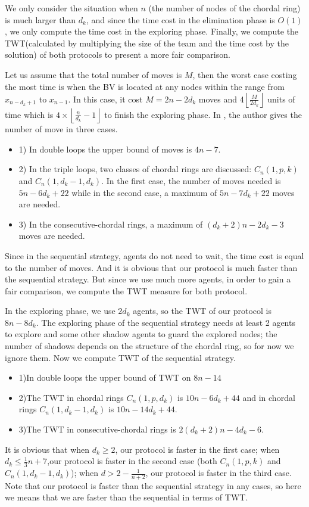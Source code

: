  
 
 

We only consider the situation when $n$ (the number of nodes of the chordal ring) is much larger than $d_k$, and since the time cost in the elimination phase is $O(1)$, we only compute the time cost in the exploring phase. Finally, we compute the TWT(calculated by multiplying the size of the team and the time cost by the solution) of both protocols to present a more fair comparison.

Let us assume that the total number of moves is $M$, then the worst case costing the most time is when the BV is located at any nodes within the range from $x_{n-d_k+1}$ to $x_{n-1}$. In this case, it cost $M=2n-2d_k$ moves and 4$\left \lfloor \frac{M}{2d_k}\right \rfloor$ units of time which is $4\times \left \lfloor \frac{n}{d_k}-1\right \rfloor$ to finish the exploring phase. 
In \cite{alotaibi}, the author gives the number of move in three cases.
\begin{itemize}
\item 1) In double loops the upper bound of moves is $4n-7$.
\item 2) In the triple loops,  two classes of chordal rings are discussed: $C_n(1,p,k)$ and $C_n(1,d_k-1,d_k)$. In the first case, the number of moves needed is $5n-6d_k+22$ while in the second case, a maximum of $5n-7d_k+22$ moves are needed.
\item 3) In the consecutive-chordal rings, a maximum of $(d_k+2)n-2d_k-3$ moves are needed.
\end{itemize}
Since in the sequential strategy, agents do not need to wait, the time cost is equal to the number of moves. And it is obvious that our protocol is much faster than the sequential strategy. But since we use much more agents,   in order to gain a fair comparison,   we compute the TWT measure for both protocol.

In the exploring phase, we use $2d_k$ agents, so the TWT of our protocol is $8n-8d_k$. The exploring phase of the sequential strategy needs at least 2 agents to explore and some other shadow agents to guard the explored nodes;  the number of shadows depends on the structure of the chordal ring, so for now we ignore them. Now we compute TWT of the sequential strategy.
\begin{itemize}
\item 1)In double loops the upper bound of TWT on  $8n-14$
\item 2)The TWT in chordal rings $C_n(1,p,d_k)$ is $10n-6d_k+44$ and in chordal rings $C_n(1,d_k-1,d_k)$ is $10n-14d_k+44$.
\item 3)The TWT in consecutive-chordal rings is $2(d_k+2)n-4d_k-6$.
\end{itemize}
It is obvious that when $d_k\geq 2$, our protocol is faster in the  first case; when $d_k\leq \frac{1}{3}n+7$,our protocol is faster in the second case (both $C_n(1,p,k)$ and $C_n(1,d_k-1,d_k)$); when $d>2-\frac{1}{n+2}$, our protocol is faster in the third case. Note that our protocol is faster than the sequential strategy in any cases, so here we means that we are faster than the sequential in terms of TWT.

